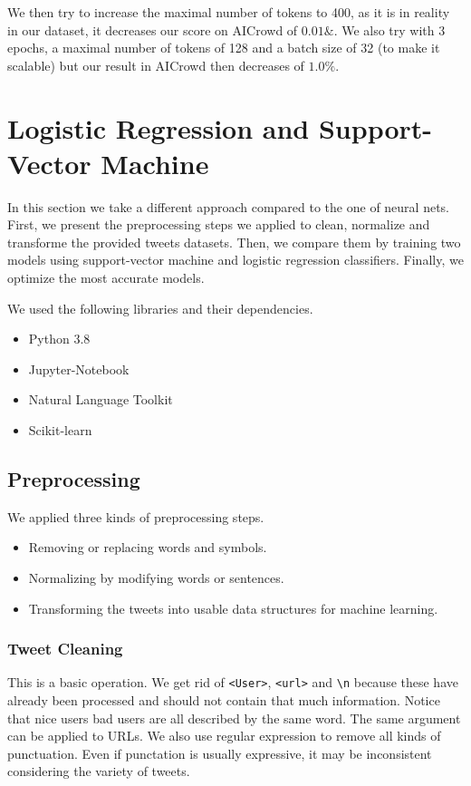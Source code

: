 \documentclass[11pt, a4paper, twocolumn]{article}
\begin{document}
We then try to increase the maximal number of tokens to 400, as it is in reality in our dataset, it decreases our score on AICrowd of $0.01\&$. We also try with 3 epochs, a maximal number of tokens of 128 and a batch size of 32 (to make it scalable) but our result in AICrowd then decreases of $1.0\%$.

\section{Logistic Regression and Support-Vector Machine}
In this section we take a different approach compared to the one of neural nets. First, we present the preprocessing steps we applied to clean, normalize and transforme the provided tweets datasets. Then, we compare them by training two models using support-vector machine and logistic regression classifiers. Finally, we optimize the most accurate models.

We used the following libraries and their dependencies.
\begin{itemize}
	\setlength\itemsep{1px}
	\item Python 3.8
	\item Jupyter-Notebook
	\item Natural Language Toolkit
	\item Scikit-learn
\end{itemize}

\subsection{Preprocessing}
We applied three kinds of preprocessing steps.
\begin{itemize}
	\setlength\itemsep{1px}
	\item Removing or replacing words and symbols.
	\item Normalizing by modifying words or sentences.
	\item Transforming the tweets into usable data structures for machine learning.
\end{itemize}

\subsubsection{Tweet Cleaning}
This is a basic operation. We get rid of \texttt{<User>}, \texttt{<url>} and \verb"\n" because these have already been processed and should not contain that much information. Notice that nice users bad users are all described by the same word. The same argument can be applied to URLs. We also use regular expression to remove all kinds of punctuation. Even if punctation is usually expressive, it may be inconsistent considering the variety of tweets.
\end{document}
